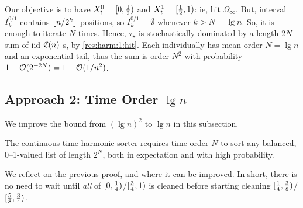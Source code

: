 \documentclass{article}
\begin{document}
\begin{Proof}
Our objective is to have $X_t^0 = [0, \tfrac12)$ and $X_t^1 = [\tfrac12, 1)$: ie, hit $\Omega_\infty$.
But, interval $I_k^{0/1}$ contains $\lfloor n/2^k \rfloor$ positions, so $I_k^{0/1} = \emptyset$ whenever $k > N = \lg n$.
So, it is enough to iterate $N$ times.
Hence,
\(
	\tau_\star
\)
is stochastically dominated by a length-$2N$ sum of iid $\mathfrak{C}(n)$-s,
by \cref{res:harm:1:hit}.
Each individually has mean order $N = \lg n$ and an exponential tail, thus the sum is order $N^2$ with probability $1 - \mathcal{O}( 2^{-2N} ) = 1 - \mathcal{O}( 1/n^2 )$.
\end{Proof}



\subsection{Approach 2: Time Order $\lg n$}
\label{sec:harm:2}

We improve the bound from $(\lg n)^2$ to $\lg n$ in this subsection.

\begin{thm}
\label{res:harm:2:main}
The continuous-time harmonic sorter
requires time order $N$ to sort any balanced, 0--1-valued list of length $2^N$,
both in expectation and with high probability.
\end{thm}

We reflect on the previous proof, and where it can be improved.
In short, there is no need to wait until \emph{all} of $[0, \tfrac14)$/$[\tfrac34, 1)$ is cleaned before starting cleaning $[\tfrac14, \tfrac38)$/$[\tfrac58, \tfrac34)$.
\end{document}
